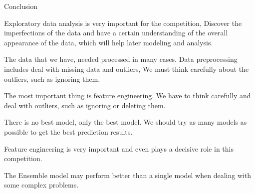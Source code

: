 \documentclass[
 size=12pt,
 paper=smartboard, %
 mode=present, %
 display=slides, %
 style=tuliplab,  %
 pauseslide,
 fleqn,leqno,clock]{powerdot}
\begin{document}
\begin{slide}[toc=,bm=]{Conclusion}
	\begin{description}
		\item Exploratory data analysis is
		      very important for the competition,
		      Discover the imperfections of the
		      data and have a certain understanding
		      of the overall appearance of the data,
		      which will help later modeling and analysis.
		\item The data that we have,
		      needed processed in many cases.
		      Data preprocessing includes
		      deal with missing data and outliers,
		      We must think carefully about the outliers,
		      such as ignoring them.
		\item The most important thing is
		      feature engineering.
		      We have to think carefully and
		      deal with outliers, such as ignoring
		      or deleting them.
		\item There is no best model,
		      only the best model. We should
		      try as many models as possible to
		      get the best prediction results.
		\item Feature engineering is very
		      important and even plays a decisive
		      role in this competition.
		\item The Ensemble model may perform better
		      than a single model when dealing
		      with some complex problems.
	\end{description}



\end{slide}

\begin{wideslide}[toc=,bm=]{}
	\centering
	\twocolumn[
		lcolwidth=0.35\linewidth,
		rcolwidth=0.65\linewidth
	]
	{
	}
	{


		\textcolor{black}{}


	}
\end{wideslide}
\end{document}
